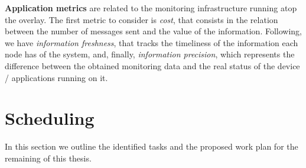 \textbf{Application metrics} are related to the monitoring infrastructure running atop the overlay. The first metric to consider is \textit{cost}, that consists in the relation between the number of messages sent and the value of the information. 
Following, we have \textit{information freshness}, that tracks the timeliness of the information each node has of the system, and, finally, \textit{information precision}, which represents the difference between the obtained monitoring data and the real status of the device / applications running on it. 


\section{Scheduling}

In this section we outline the identified tasks and the proposed work plan for the remaining of this thesis. 

